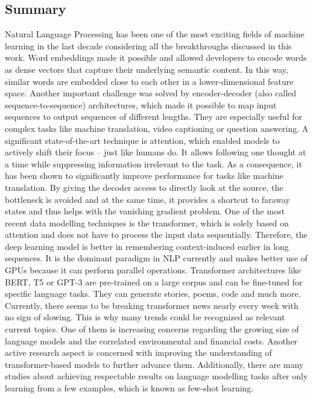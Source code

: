 \documentclass[
]{krantz}
\begin{document}
\hypertarget{summary}{%
\subsection{Summary}\label{summary}}

Natural Language Processing has been one of the most exciting fields of
machine learning in the last decade considering all the breakthroughs
discussed in this work. Word embeddings made it possible and allowed
developers to encode words as dense vectors that capture their
underlying semantic content. In this way, similar words are embedded
close to each other in a lower-dimensional feature space. Another
important challenge was solved by encoder-decoder (also called
sequence-to-sequence) architectures, which made it possible to map input
sequences to output sequences of different lengths. They are especially
useful for complex tasks like machine translation, video captioning or
question answering. A significant state-of-the-art technique is
attention, which enabled models to actively shift their focus -- just
like humans do. It allows following one thought at a time while
suppressing information irrelevant to the task. As a consequence, it has
been shown to significantly improve performance for tasks like machine
translation. By giving the decoder access to directly look at the
source, the bottleneck is avoided and at the same time, it provides a
shortcut to faraway states and thus helps with the vanishing gradient
problem. One of the most recent data modelling techniques is the
transformer, which is solely based on attention and does not have to
process the input data sequentially. Therefore, the deep learning model
is better in remembering context-induced earlier in long sequences. It
is the dominant paradigm in NLP currently and makes better use of GPUs
because it can perform parallel operations. Transformer architectures
like BERT, T5 or GPT-3 are pre-trained on a large corpus and can be
fine-tuned for specific language tasks. They can generate stories,
poems, code and much more. Currently, there seems to be breaking
transformer news nearly every week with no sign of slowing. This is why
many trends could be recognized as relevant current topics. One of them
is increasing concerns regarding the growing size of language models and
the correlated environmental and financial costs. Another active
research aspect is concerned with improving the understanding of
transformer-based models to further advance them. Additionally, there
are many studies about achieving respectable results on language
modelling tasks after only learning from a few examples, which is known
as few-shot learning.
\end{document}
